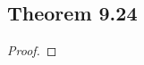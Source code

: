 \documentclass[../../main.tex]{subfiles}
\begin{document}
\subsection{Theorem 9.24}
\begin{wts}

\end{wts}
\begin{proof}

\end{proof}
\end{document}

